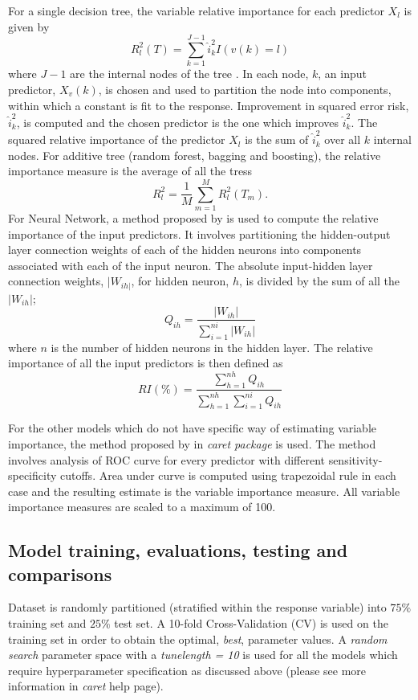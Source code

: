 For a single decision tree, the variable relative importance for each predictor $X_l$ is given by
\[
R^2_{l}(T) = \sum^{J-1}_{k=1}\hat{i}^2_kI(v(k) = l)
\]
where $J-1$ are the internal nodes of the tree \cite{trevor2009elements}. In each node, $k$, an input predictor, $X_v(k)$, is chosen and used to partition the node into components, within which a constant is fit to the response. Improvement in squared error risk, $\hat{i}^2_k$, is computed and the chosen predictor is the one which improves $\hat{i}^2_k$. The squared relative importance of the predictor $X_l$ is the sum of $\hat{i}^2_k$ over all $k$ internal nodes. For additive tree (random forest, bagging and boosting), the relative importance measure is the average of all the tress
\[
R^2_{l} = \frac{1}{M}\sum^M_{m=1}R^2_{l}(T_m).
\]
For Neural Network, a method proposed by \citet{gevrey2003review} is used to compute the relative importance of the input predictors. It involves partitioning the hidden-output layer connection weights of each of the hidden neurons into components associated with each of the input neuron. The absolute input-hidden layer connection weights, $|W_{ih|}$, for hidden neuron, $h$, is divided by the sum of all the $|W_{ih}|$;
\[
Q_{ih} = \frac{|W_{ih}|}{\sum^{ni}_{i=1}|W_{ih}|}
\]
where $n$ is the number of hidden neurons in the hidden layer. The relative importance of all the input predictors is then defined as
\[
RI(\%) = \frac{\sum^{nh}_{h=1}Q_{ih}}{\sum^{nh}_{h=1}\sum^{ni}_{i=1}Q_{ih}}
\]

\noindent For the other models which do not have specific way of estimating variable importance, the method proposed by \citet{caretpackage} in \textit{caret package} is used. The method involves analysis of ROC curve for every predictor with different sensitivity-specificity cutoffs. Area under curve is computed using trapezoidal rule in each case and the resulting estimate is the variable importance measure. All variable importance measures are scaled to a maximum of 100.

\subsection{Model training, evaluations, testing and comparisons}

Dataset is randomly partitioned (stratified within the response variable) into $75\%$ training set and $25\%$ test set. A 10-fold Cross-Validation (CV) is used on the training set in order to obtain the optimal, \textit{best}, parameter values. A \textit{random search} parameter space with a \textit{tunelength = 10} is used for all the models which require hyperparameter specification as discussed above (please see more information in \textit{caret} help page). \\

